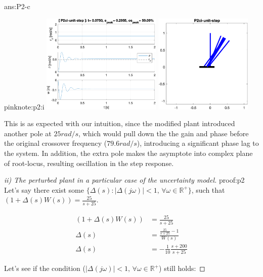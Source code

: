 \documentclass{tron}
\begin{document}
\begin{answer}{ans:P2-c}
\begin{note}{pink}{note:p2:i}
		{	
			\centering
			\includegraphics[height=180px]{../matlab/output/q2/step_response_P2ci-unit-step} \qquad
			\includegraphics[height=180px]{../matlab/output/q2/sim_P2ci-unit-step}
		}			
		
		This is as expected with our intuition, since the modified plant introduced another pole at $25 \unit{rad/s}$, which would pull down the the gain and phase before the original crossover frequency ($79.6 \unit{rad/s}$), introducing a significant phase lag to the system. In addition, the extra pole makes the asymptote into complex plane of root-locus, resulting oscillation in the step response. 
	\end{note}
	
	\begin{proof}[ii) The perturbed plant in  a particular case of the uncertainty model]{proof:p2}
		Let's say there exist some $\{\Delta(s) : |\Delta(j\omega)| < 1 ,\,\forall \omega \in \mathbb{R^+}\}$, such that $(1 + \Delta(s)W(s)) = \frac{25}{s + 25}$.
		
		\begin{align}
			(1 + \Delta(s)W(s)) &= \frac{25}{s + 25} \\
			\Delta(s) &= \frac{\frac{25}{s + 25} - 1}{W(s)} \\
			\Delta(s) &= - \frac{1}{10} \frac{s+200}{s+25}
		\end{align}
		
		Let's see if the condition ($|\Delta(j\omega)| < 1 ,\,\forall \omega \in \mathbb{R^+}$) still holds:
		

\end{proof}
\end{answer}
\end{document}
